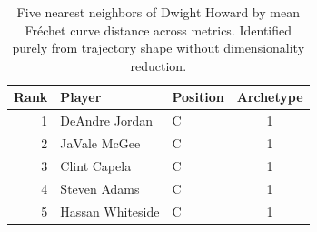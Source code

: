 \begin{table}[htbp]
  \centering\small
  \begin{tabular}{rllc}
    \toprule
    Rank & Player & Position & Archetype \\
    \midrule
    1 & DeAndre Jordan & C & 1 \\
    2 & JaVale McGee & C & 1 \\
    3 & Clint Capela & C & 1 \\
    4 & Steven Adams & C & 1 \\
    5 & Hassan Whiteside & C & 1 \\
    \bottomrule
  \end{tabular}
  \caption{Five nearest neighbors of Dwight Howard by mean Fr\'{e}chet curve distance across metrics. Identified purely from trajectory shape without dimensionality reduction.}
  \label{tab:Dwight_Howard_frechet_curve_neighbors}
\end{table}

